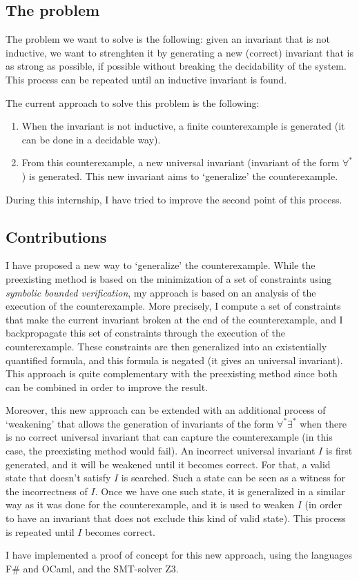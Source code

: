 \documentclass{article}
\newenvironment{point}[1]%
{\subsection*{#1}}%
{}
\begin{document}
\begin{point}{The problem}
  
  The problem we want to solve is the following:
  given an invariant that is not inductive, we want to strenghten it by generating a new (correct) invariant that is as strong as possible,
  if possible without breaking the decidability of the system.
  This process can be repeated until an inductive invariant is found.

  The current approach to solve this problem is the following:
  \begin{enumerate}
    \item When the invariant is not inductive, a finite counterexample is generated (it can be done in a decidable way).
    \item From this counterexample, a new universal invariant (invariant of the form \(\forall^*\)) is generated. This new invariant aims to `generalize' the counterexample.
  \end{enumerate}
  
  During this internship, I have tried to improve the second point of this process.

\end{point}

\begin{point}{Contributions}

  I have proposed a new way to `generalize' the counterexample. While the preexisting method is based on the
  minimization of a set of constraints using \textit{symbolic bounded verification},
  my approach is based on an analysis of the execution of the counterexample.
  More precisely, I compute a set of constraints that make the current invariant broken at the end of the counterexample,
  and I backpropagate this set of constraints through the execution of the counterexample.
  These constraints are then generalized into an existentially quantified formula, and this formula is negated
  (it gives an universal invariant).
  This approach is quite complementary with the preexisting method since both can be combined in order to improve the result.

  Moreover, this new approach can be extended with an additional process of `weakening' that
  allows the generation of invariants of the form \(\forall^*\exists^*\) when there is no
  correct universal invariant that can capture the counterexample (in this case, the preexisting method would fail).
  An incorrect universal invariant \(I\) is first generated, and it will be weakened until it becomes correct.
  For that, a valid state that doesn't satisfy \(I\) is searched.
  Such a state can be seen as a witness for the incorrectness of \(I\). Once we have one such state,
  it is generalized in a similar way as it was done for the counterexample, and it is used to weaken \(I\)
  (in order to have an invariant that does not exclude this kind of valid state).
  This process is repeated until \(I\) becomes correct.

  I have implemented a proof of concept for this new approach, using the languages F\# and OCaml, and the SMT-solver Z3.
 
\end{point}
\end{document}
